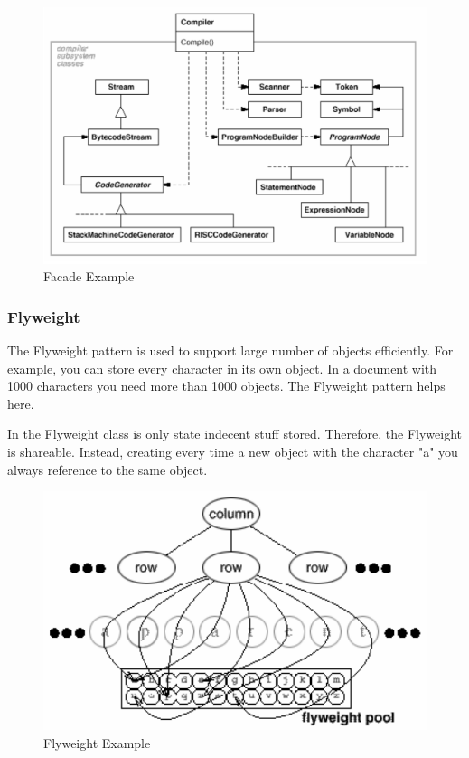 \documentclass[11pt]{article}
\begin{document}
\begin{figure}[htbp]
\centering
\includegraphics[width=.9\linewidth]{img/facade_example.png}
\caption{\label{fig:facade-example}Facade Example}
\end{figure}
\subsubsection{Flyweight}
\label{sec:org4503c0c}
The Flyweight pattern is used to support large number of objects efficiently.
For example, you can store every character in its own object.
In a document with 1000 characters you need more than 1000 objects.
The Flyweight pattern helps here.

In the Flyweight class is only state indecent stuff stored.
Therefore, the Flyweight is shareable.
Instead, creating every time a new object with the character "a" you always reference to the same object.


\begin{figure}[htbp]
\centering
\includegraphics[width=.9\linewidth]{img/flyweight_example.png}
\caption{\label{fig:flyweight-example}Flyweight Example}
\end{figure}
\end{document}
